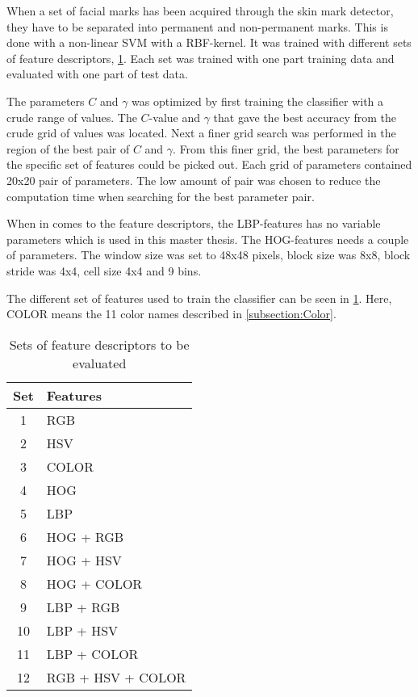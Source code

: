 When a set of facial marks has been acquired through the skin mark detector, they have to be separated into permanent and non-permanent marks. This is done with a non-linear SVM with a RBF-kernel. It was trained with different sets of feature descriptors, \cref{table:feature_sets}. Each set was trained with one part training data and evaluated with one part of test data.

The parameters $C$ and $\gamma$ was optimized by first training the classifier with a crude range of values. The $C$-value and $\gamma$ that gave the best accuracy from the crude grid of values was located. Next a finer grid search was performed in the region of the best pair of $C$ and $\gamma$. From this finer grid, the best parameters for the specific set of features could be picked out. Each grid of parameters contained 20x20 pair of parameters. The low amount of pair was chosen to reduce the computation time when searching for the best parameter pair.  

When in comes to the feature descriptors, the LBP-features has no variable parameters which is used in this master thesis. The HOG-features needs a couple of parameters. The window size was set to 48x48 pixels, block size was 8x8, block stride was 4x4, cell size 4x4 and 9 bins. 

The different set of features used to train the classifier can be seen in \cref{table:feature_sets}. Here, COLOR means the 11 color names described in \cref{subsection:Color}. 

\FloatBarrier
\begin{table}[h!]
	\begin{center}
		\caption{Sets of feature descriptors to be evaluated}
		\begin{tabular}{|c|l|}
			\hline
			Set &  Features   \\ \hline
			 1  &     RGB     \\ \hline
			 2  &     HSV     \\ \hline
			 3  &    COLOR    \\ \hline
			 4  &     HOG     \\ \hline
			 5  &     LBP     \\ \hline
			 6  &  HOG + RGB  \\ \hline
			 7  &  HOG + HSV  \\ \hline
			 8  & HOG + COLOR \\ \hline
			 9  &  LBP + RGB  \\ \hline
			 10  &  LBP + HSV  \\ \hline
			 11  & LBP + COLOR \\ \hline
			 12  & RGB + HSV + COLOR \\ \hline
		\end{tabular}
		\label{table:feature_sets}
	\end{center}
\end{table}
\FloatBarrier

